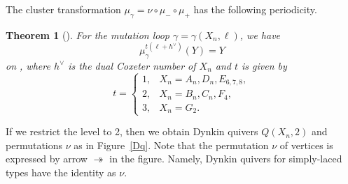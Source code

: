 \documentclass[10pt,a4paper]{amsart}
\numberwithin{equation}{section}
\newtheorem{Theorem}{Theorem}[section]
\begin{document}
The cluster transformation $\mu_\gamma=\nu\circ\mu_-\circ\mu_+$ has the following periodicity.
		\begin{Theorem}[{\cite{IIKKN, IIKKN2, K}}]%
		For the mutation loop $\gamma=\gamma(X_n,\ell)$, we have
			\[\mu_\gamma^{t(\ell+h^\vee)}(Y)=Y\]
		on , where $h^\vee$ is the dual Coxeter number of $X_n$ and $t$ is given by
			\[t=\begin{cases}
				1,&X_n=A_n,D_n,E_{6,7,8},\\
				2,&X_n=B_n,C_n,F_4,\\
				3,&X_n=G_2.
			\end{cases}\]
		\end{Theorem}

If we restrict the level to 2, then we obtain Dynkin quivers $Q(X_n,2)$ and permutations $\nu$ as in Figure~\ref{Dq}.
Note that the permutation $\nu$ of vertices is expressed by arrow $\twoheadrightarrow$ in the figure.
Namely, Dynkin quivers for simply-laced types have the identity as $\nu$.
\end{document}
